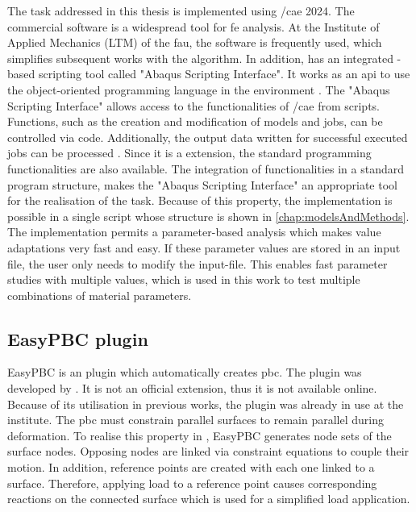 The task addressed in this thesis is implemented using /\acrshort{cae} 2024. The commercial software is a widespread tool for \acrshort{fe} analysis. At the Institute of Applied Mechanics (LTM) of the \acrfull{fau}, the software is frequently used, which simplifies subsequent works with the algorithm. In addition,  has an integrated -based scripting tool called "Abaqus Scripting Interface". It works as an \acrfull{api} to use the object-oriented programming language  in the  environment \cite{dassault_systems_abaqus_2015-1}. The "Abaqus Scripting Interface" allows access to the functionalities of /\acrshort{cae} from scripts. Functions, such as the creation and modification of models and jobs, can be controlled via code. Additionally, the output data written for successful executed jobs can be processed \cite{dassault_systems_abaqus_2015-1}. Since it is a  extension, the standard programming functionalities are also available. The integration of  functionalities in a standard program structure, makes the "Abaqus Scripting Interface" an appropriate tool for the realisation of the task. Because of this property, the implementation is possible in a single script whose structure is shown in \autoref{chap:modelsAndMethods}. The implementation permits a parameter-based analysis which makes value adaptations very fast and easy. If these parameter values are stored in an input file, the user only needs to modify the input-file. This enables fast parameter studies with multiple values, which is used in this work to test multiple combinations of material parameters.  


\subsection{EasyPBC plugin} \label{subsec: EasPBC}

EasyPBC is an  plugin which automatically creates \acrshort{pbc}. The plugin was developed by \citet{omairey_development_2019}. It is not an official  extension, thus it is not available online. Because of its utilisation in previous works, the plugin was already in use at the institute. The \acrshort{pbc} must constrain parallel surfaces to remain parallel during deformation. To realise this property in , EasyPBC generates node sets of the surface nodes. Opposing nodes are linked via constraint equations to couple their motion. In addition, reference points are created with each one linked to a surface. Therefore, applying load to a reference point causes corresponding reactions on the connected surface which is used for a simplified load application. 

